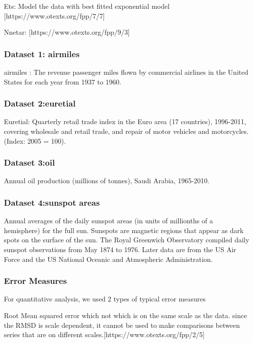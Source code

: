 Ets: Model the data with best fitted exponential model [https://www.otexts.org/fpp/7/7]

	Nnetar: [https://www.otexts.org/fpp/9/3]

\subsubsection{Dataset 1: airmiles}
airmiles : The revenue passenger miles flown by commercial airlines in the United States for each year from 1937 to 1960.

\subsubsection{Dataset 2:euretial}
Euretial: Quarterly retail trade index in the Euro area (17 countries), 1996-2011, covering wholesale and retail trade, and repair of motor vehicles and motorcycles. (Index: 2005 = 100).

\subsubsection{Dataset 3:oil}
Annual oil production (millions of tonnes), Saudi Arabia, 1965-2010.

\subsubsection{Dataset 4:sunspot areas}
Annual averages of the daily sunspot areas (in units of millionths of a hemisphere) for the full sun. Sunspots are magnetic regions that appear as dark spots on the surface of the sun. The Royal Greenwich Observatory compiled daily sunspot observations from May 1874 to 1976. Later data are from the US Air Force and the US National Oceanic and Atmospheric Administration.



\subsubsection{Error Measures}



For quantitative analysis, we used 2 types of  typical error measures 

Root Mean squared error which  not which is on the same scale as the data. since the RMSD is scale dependent, it cannot be used to make comparisons between series that are on different scales.[https://www.otexts.org/fpp/2/5]



